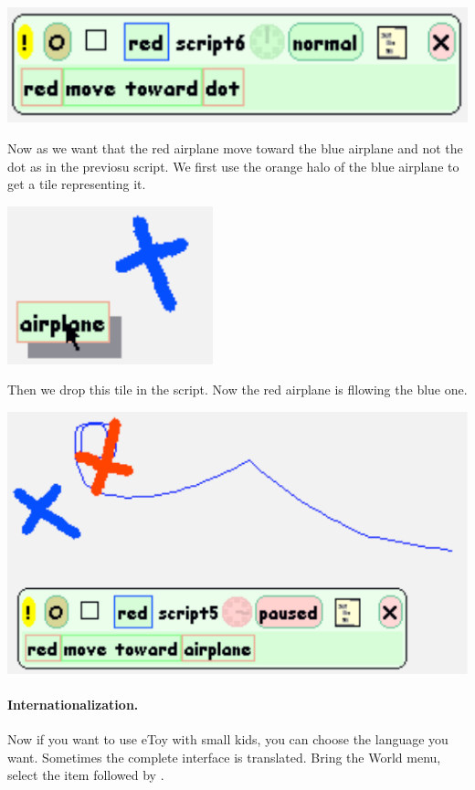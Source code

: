 \begin{center}\includegraphics[]{moveToward}\end{center}
Now as we want that the red airplane move toward the blue airplane and not the dot as in the previosu script. We first use the orange halo of the blue airplane to get a tile representing it.
\begin{center}\includegraphics[]{makeAtile}\end{center}
Then we drop this tile in the script. Now the red airplane is fllowing the blue one.
\begin{center}\includegraphics[]{following}\end{center}


\paragraph{Internationalization.} Now if you want to use eToy with small kids, you can choose the language you want. Sometimes the complete \sq interface is translated. Bring the World menu, select the item  followed by .

